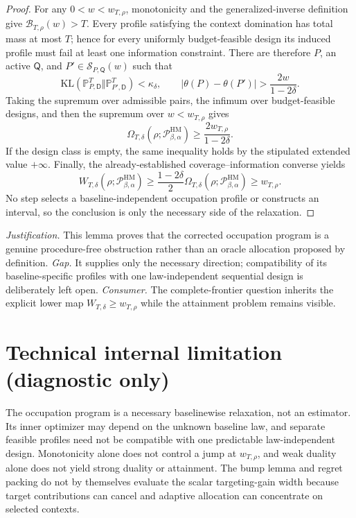 \documentclass{article}
\begin{document}
\begin{proof}
For any \(0<w<w_{T,\rho}\), monotonicity and the generalized-inverse definition give \(\mathcal B_{T,\rho}(w)>T\).  Every profile satisfying the context domination has total mass at most \(T\); hence for every uniformly budget-feasible design its induced profile must fail at least one information constraint.  There are therefore \(P\), an active \(\mathsf Q\), and \(P'\in\mathcal S_{P,\mathsf Q}(w)\) such that
\[
\mathrm{KL}(\mathbb P_{P,\mathsf D}^{T}\Vert\mathbb P_{P',\mathsf D}^{T})<\kappa_\delta,
\qquad
|\theta(P)-\theta(P')|>\frac{2w}{1-2\delta}.
\]
Taking the supremum over admissible pairs, the infimum over budget-feasible designs, and then the supremum over \(w<w_{T,\rho}\) gives
\[
\Omega_{T,\delta}(\rho;\mathcal P_{\beta,\alpha}^{\mathrm{HM}})
\ge\frac{2w_{T,\rho}}{1-2\delta}.
\]
If the design class is empty, the same inequality holds by the stipulated extended value \(+\infty\).  Finally, the already-established coverage--information converse yields
\[
W_{T,\delta}(\rho;\mathcal P_{\beta,\alpha}^{\mathrm{HM}})
\ge\frac{1-2\delta}{2}\Omega_{T,\delta}(\rho;\mathcal P_{\beta,\alpha}^{\mathrm{HM}})
\ge w_{T,\rho}.
\]
No step selects a baseline-independent occupation profile or constructs an interval, so the conclusion is only the necessary side of the relaxation.
\end{proof}
\par\smallskip\noindent \textit{Justification.} This lemma proves that the corrected occupation program is a genuine procedure-free obstruction rather than an oracle allocation proposed by definition. \textit{Gap.} It supplies only the necessary direction; compatibility of its baseline-specific profiles with one law-independent sequential design is deliberately left open. \textit{Consumer.} The complete-frontier question inherits the explicit lower map \(W_{T,\delta}\ge w_{T,\rho}\) while the attainment problem remains visible.

\section*{Technical internal limitation (diagnostic only)}

The occupation program is a necessary baselinewise relaxation, not an estimator. Its inner optimizer may depend on the unknown baseline law, and separate feasible profiles need not be compatible with one predictable law-independent design. Monotonicity alone does not control a jump at \(w_{T,\rho}\), and weak duality alone does not yield strong duality or attainment. The bump lemma and regret packing do not by themselves evaluate the scalar targeting-gain width because target contributions can cancel and adaptive allocation can concentrate on selected contexts.
\end{document}
